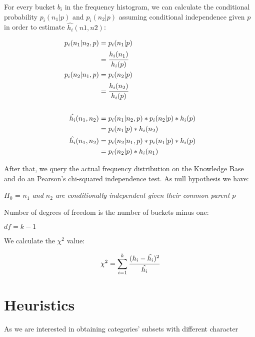 For every bucket $b_i$ in the frequency histogram, we can calculate the conditional probability $p_i(n_1|p)$ and $p_i(n_2|p)$ assuming conditional independence given $p$ in order to estimate $\hat{h_i}(n1,n2)$:

\begin{equation}
\begin{split}
 p_i(n_1|n_2,p) &= p_i(n_1|p) \\ 
 &= \cfrac{h_i(n_1)}{h_i(p)} \\ 
 p_i(n_2|n_1,p) &= p_i(n_2|p) \\ 
 &= \cfrac{h_i(n_2)}{h_i(p)} \\ \\ 
 \hat{h_i}(n_1,n_2) &= p_i(n_1|n_2,p)*p_i(n_2|p)*h_i(p) \\ 
 &= p_i(n_1|p)*h_i(n_2) \\ 
 \hat{h_i}(n_1,n_2) &= p_i(n_2|n_1,p)*p_i(n_1|p)*h_i(p) \\ 
 &= p_i(n_2|p)*h_i(n_1) 
\end{split}
\end{equation}

After that, we query the actual frequency distribution on the Knowledge Base and do an Pearson's chi-squared independence test. As null hypothesis we have:

\begin{center}
  $H_0$ = \emph{$n_1$ and $n_2$ are conditionally independent given their common parent $p$} 
\end{center}

Number of degrees of freedom is the number of buckets minus one:

\begin{center}
 $df=k-1$
\end{center}

We calculate the $\chi^2$ value:

\begin{equation}
 \chi^2=\sum_{i=1}^{k} \cfrac{(h_i - \hat{h_i})^2}{\hat{h_i}}
\end{equation}

\section{Heuristics}

As we are interested in obtaining categories' subsets with different character
